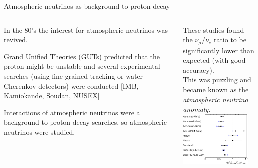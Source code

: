 \begin{frame}[t]{Atmospheric neutrinos as background to proton decay}
\begin{columns}[t]
  \begin{column}{0.50\textwidth}
   \begin{itemize}
    {\small
     \item In the 80's the interest for atmospheric neutrinos was revived.\\
           \vspace{0.4cm}
     \item Grand Unified Theories (GUTs) predicted that the proton might be unstable
           and several experimental searches (using fine-grained tracking or water
           Cherenkov detectors) were conducted [IMB, Kamiokande, Soudan, NUSEX]\\
           \vspace{0.4cm}
     \item Interactions of atmospheric neutrinos were a background to proton decay
           searches, so atmospheric neutrinos were studied.
    }
   \end{itemize}
  \end{column}
  \begin{column}{0.50\textwidth}
   {\small
    \centering
    These studies found the $\nu_{\mu}/\nu_{e}$ ratio to be significantly lower than expected (with good accuracy).\\
    \vspace{0.2cm}
    This was puzzling and became known as the {\em \color{red} atmospheric neutrino anomaly.}\\
    \vspace{0.4cm}
    \includegraphics[width=0.90\textwidth]{./images/3nu/atmo/dblratio.png}\\
   }
  \end{column}
\end{columns}
\end{frame}

